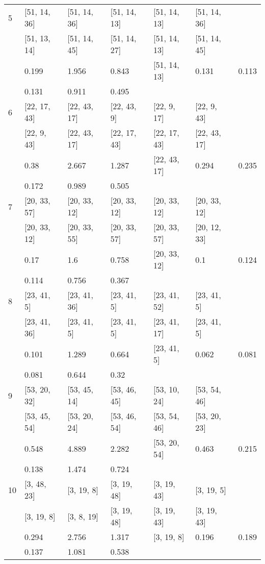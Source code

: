 \begin{longtable}{| l || l | l | l | l | l | l | }
\hline
5  & [51, 14, 36] & [51, 14, 36] & [51, 14, 13] & [51, 14, 13] & [51, 14, 36] \\
 & [51, 13, 14] & [51, 14, 45] & [51, 14, 27] & [51, 14, 13] & [51, 14, 45]\\
\hline
& 0.199 & 1.956 & 0.843 & [51, 14, 13] & 0.131 & 0.113\\
\hline
& 0.131 & 0.911 & 0.495 \\
\hline

\hline
6  & [22, 17, 43] & [22, 43, 17] & [22, 43, 9] & [22, 9, 17] & [22, 9, 43] \\
 & [22, 9, 43] & [22, 43, 17] & [22, 17, 43] & [22, 17, 43] & [22, 43, 17]\\
\hline
& 0.38 & 2.667 & 1.287 & [22, 43, 17] & 0.294 & 0.235\\
\hline
& 0.172 & 0.989 & 0.505 \\
\hline

\hline
7  & [20, 33, 57] & [20, 33, 12] & [20, 33, 12] & [20, 33, 12] & [20, 33, 12] \\
 & [20, 33, 12] & [20, 33, 55] & [20, 33, 57] & [20, 33, 57] & [20, 12, 33]\\
\hline
& 0.17 & 1.6 & 0.758 & [20, 33, 12] & 0.1 & 0.124\\
\hline
& 0.114 & 0.756 & 0.367 \\
\hline

\hline
8  & [23, 41, 5] & [23, 41, 36] & [23, 41, 5] & [23, 41, 52] & [23, 41, 5] \\
 & [23, 41, 36] & [23, 41, 5] & [23, 41, 5] & [23, 41, 17] & [23, 41, 5]\\
\hline
& 0.101 & 1.289 & 0.664 & [23, 41, 5] & 0.062 & 0.081\\
\hline
& 0.081 & 0.644 & 0.32 \\
\hline

\hline
9  & [53, 20, 32] & [53, 45, 14] & [53, 46, 45] & [53, 10, 24] & [53, 54, 46] \\
 & [53, 45, 54] & [53, 20, 24] & [53, 46, 54] & [53, 54, 46] & [53, 20, 23]\\
\hline
& 0.548 & 4.889 & 2.282 & [53, 20, 54] & 0.463 & 0.215\\
\hline
& 0.138 & 1.474 & 0.724 \\
\hline

\hline
10  & [3, 48, 23] & [3, 19, 8] & [3, 19, 48] & [3, 19, 43] & [3, 19, 5] \\
 & [3, 19, 8] & [3, 8, 19] & [3, 19, 48] & [3, 19, 43] & [3, 19, 43]\\
\hline
& 0.294 & 2.756 & 1.317 & [3, 19, 8] & 0.196 & 0.189\\
\hline
& 0.137 & 1.081 & 0.538 \\
\hline


\end{longtable}
